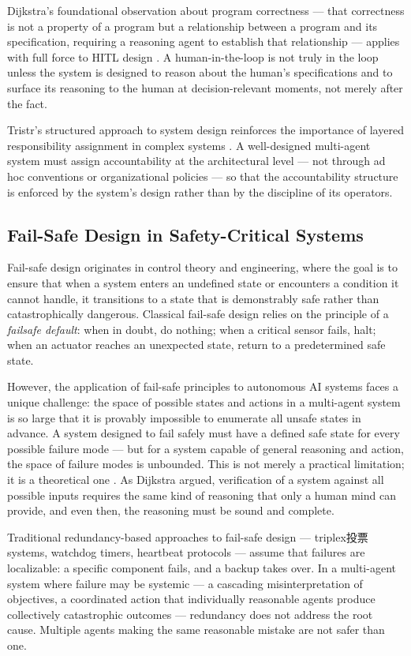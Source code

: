 Dijkstra's foundational observation about program correctness — that correctness is not a property of a program but a relationship between a program and its specification, requiring a reasoning agent to establish that relationship — applies with full force to HITL design \cite{dijkstra1982}. A human-in-the-loop is not truly in the loop unless the system is designed to reason about the human's specifications and to surface its reasoning to the human at decision-relevant moments, not merely after the fact.

Tristr's structured approach to system design reinforces the importance of layered responsibility assignment in complex systems \cite{tristr81}. A well-designed multi-agent system must assign accountability at the architectural level — not through ad hoc conventions or organizational policies — so that the accountability structure is enforced by the system's design rather than by the discipline of its operators.

\subsection{Fail-Safe Design in Safety-Critical Systems}

Fail-safe design originates in control theory and engineering, where the goal is to ensure that when a system enters an undefined state or encounters a condition it cannot handle, it transitions to a state that is demonstrably safe rather than catastrophically dangerous. Classical fail-safe design relies on the principle of a \emph{failsafe default}: when in doubt, do nothing; when a critical sensor fails, halt; when an actuator reaches an unexpected state, return to a predetermined safe state.

However, the application of fail-safe principles to autonomous AI systems faces a unique challenge: the space of possible states and actions in a multi-agent system is so large that it is provably impossible to enumerate all unsafe states in advance. A system designed to fail safely must have a defined safe state for every possible failure mode — but for a system capable of general reasoning and action, the space of failure modes is unbounded. This is not merely a practical limitation; it is a theoretical one \cite{dijkstra1982}. As Dijkstra argued, verification of a system against all possible inputs requires the same kind of reasoning that only a human mind can provide, and even then, the reasoning must be sound and complete.

Traditional redundancy-based approaches to fail-safe design — triplex投票 systems, watchdog timers, heartbeat protocols — assume that failures are localizable: a specific component fails, and a backup takes over. In a multi-agent system where failure may be systemic — a cascading misinterpretation of objectives, a coordinated action that individually reasonable agents produce collectively catastrophic outcomes — redundancy does not address the root cause. Multiple agents making the same reasonable mistake are not safer than one.

